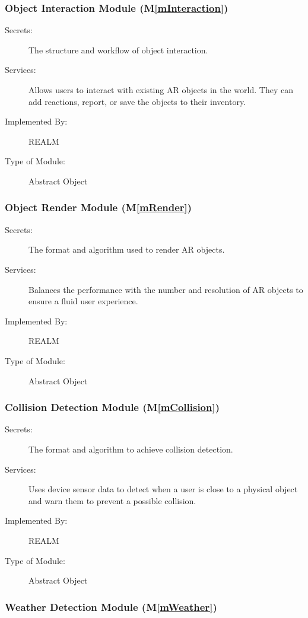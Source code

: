 \documentclass[12pt, titlepage]{article}
\newcommand{\mref}[1]{M\ref{#1}}
\begin{document}
\subsubsection{Object Interaction Module (\mref{mInteraction})}

\begin{description}
\item[Secrets:]The structure and workflow of object interaction.
\item[Services:]Allows users to interact with existing AR objects in the world. They can add reactions, report, or save the objects to their inventory.
\item[Implemented By:]REALM
\item[Type of Module:]Abstract Object
\end{description}

\subsubsection{Object Render Module (\mref{mRender})}

\begin{description}
\item[Secrets:]The format and algorithm used to render AR objects.
\item[Services:]Balances the performance with the number and resolution of AR objects to ensure a fluid user experience.
\item[Implemented By:]REALM
\item[Type of Module:]Abstract Object
\end{description}

\subsubsection{Collision Detection Module (\mref{mCollision})}

\begin{description}
\item[Secrets:]The format and algorithm to achieve collision detection.
\item[Services:]Uses device sensor data to detect when a user is close to a physical object and warn them to prevent a possible collision.
\item[Implemented By:]REALM
\item[Type of Module:]Abstract Object
\end{description}

\subsubsection{Weather Detection Module (\mref{mWeather})}
\end{document}
